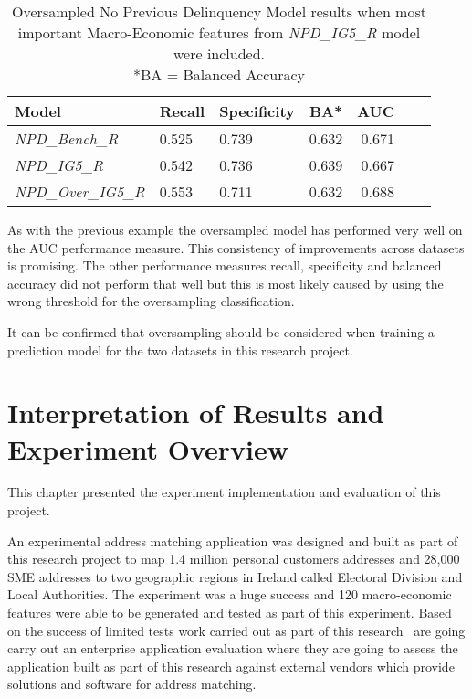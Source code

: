 \begin{table}[H]
	\centering
	\small
	\begin{tabular}{l l l r r r r}
		\hline
\textbf{Model} & \textbf{Recall} & \textbf{Specificity} & \textbf{BA*} & \textbf{AUC}  \\ \hline
\textit{NPD\_Bench\_R} & 0.525 & \cellcolor{green!25}0.739 & 0.632 & 0.671   \\ \hline
\textit{NPD\_IG5\_R} & 0.542 & 0.736 & \cellcolor{green!25}0.639 & 0.667   \\ 
\textit{NPD\_Over\_IG5\_R} &  \cellcolor{green!25}0.553 & 0.711 & 0.632 & \cellcolor{green!25}0.688   \\ \hline
	\end{tabular}
	\caption{{Oversampled No Previous Delinquency Model results when most \\important
			Macro-Economic features from \textit{NPD\_IG5\_R} model were included.
			\\ *BA = Balanced Accuracy}}
	\label{table:overNPD}
\end{table}

As with the previous example the oversampled model has performed very well on the AUC performance measure. This consistency of improvements across datasets is promising. The other performance measures recall, specificity and balanced accuracy did not perform that well but this is most likely caused by using the wrong threshold for the oversampling classification. 

It can be confirmed that oversampling should be considered when training a prediction model for the two datasets in this research project.




\section{Interpretation of Results and Experiment Overview}
This chapter presented the experiment implementation and evaluation of this project. 

An experimental address matching application was designed and built as part of this research project to map 1.4 million personal customers addresses and 28,000 SME addresses to two geographic regions in Ireland called Electoral Division and Local Authorities. The experiment was a huge success and 120 macro-economic features were able to be generated and tested as part of this experiment. Based on the success of limited tests work carried out as part of this research \subjectname\ are going carry out an enterprise application evaluation where they are going to assess the application built as part of this research against external vendors which provide solutions and software for address matching.

